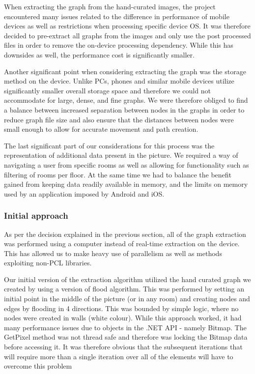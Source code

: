 \documentclass[12pt,a4paper]{report}
\begin{document}
When extracting the graph from the hand-curated images, the project encountered many issues related to the difference in performance of mobile devices as well as restrictions when processing specific device OS. It was therefore decided to pre-extract all graphs from the images and only use the post processed files in order to remove the on-device processing dependency. While this has downsides as well, the performance cost is significantly smaller.
\newline
		
Another significant point when considering extracting the graph was the storage method on the device. Unlike PCs, phones and similar mobile devices utilize significantly smaller overall storage space and therefore we could not accommodate for large, dense, and fine graphs. We were therefore obliged to find a balance between increased separation between nodes in the graphs in order to reduce graph file size and also ensure that the distances between nodes were small enough to allow for accurate movement and path creation.
\newline
	
The last significant part of our considerations for this process was the representation of additional data present in the picture. We required a way of navigating a user from specific rooms as well as allowing for functionality such as filtering of rooms per floor. At the same time we had to balance the benefit gained from keeping data readily available in memory, and the limits on memory used by an application imposed by Android and iOS.

\subsubsection{Initial approach}

As per the decision explained in the previous section, all of the graph extraction was performed using a computer instead of real-time extraction on the device. This has allowed us to make heavy use of parallelism as well as methods exploiting non-PCL libraries.
\newline
	
Our initial version of the extraction algorithm utilized the hand curated graph we created by using a version of flood algorithm. This was performed by setting an initial point in the middle of the picture (or in any room)  and creating nodes and edges by flooding in 4 directions. This was bounded by simple logic, where no nodes were created in walls (white colour). While this approach worked, it had many performance issues due to objects in the .NET API - namely Bitmap. The GetPixel method was not thread safe and therefore was locking the Bitmap data before accessing it. It was therefore obvious that the subsequent iterations that will require more than a single iteration over all of the elements will have to overcome this problem
\end{document}
